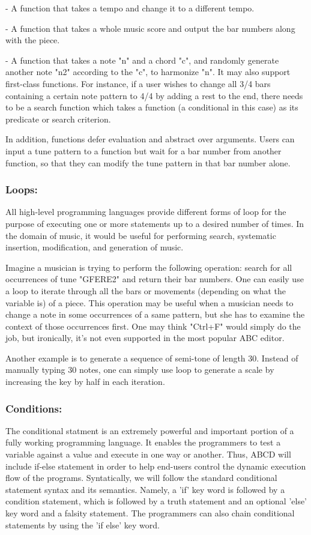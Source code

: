     - A function that takes a tempo and change it to a different tempo.

    - A function that takes a whole music score and output the bar numbers along with the piece.
    
    - A function that takes a note "n" and a chord "c", and randomly generate another note "n2" according to the "c", to harmonize "n".
      It may also support first-class functions. For instance, if a user wishes to change all 3/4 bars containing a certain note pattern to 4/4 by adding a rest to the end, there needs to be a search function which takes a function (a conditional in this case) as its predicate or search criterion. 

     In addition, functions defer evaluation and abstract over arguments. Users can input a tune pattern to a function but wait for a bar number from another function, so that they can modify the tune pattern in that bar number alone.  

    \subsubsection{Loops:}
    All high-level programming languages provide different forms of loop for the purpose of executing one or more statements up to a desired number of times. In the domain of music, it would be useful for performing search, systematic insertion, modification, and generation of music. 

    Imagine a musician is trying to perform the following operation: search for all occurrences of tune "GFERE2" and return their bar numbers. One can easily use a loop to iterate through all the bars or movements (depending on what the variable is) of a piece. This operation may be useful when a musician needs to change a note in some occurrences of a same pattern, but she has to examine the context of those occurrences first. One may think "Ctrl+F" would simply do the job, but ironically, it's not even supported in the most popular ABC editor\cite{SlashdotMedia17}.  

    Another example is to generate a sequence of semi-tone of length 30. Instead of manually typing 30 notes, one can simply use loop to generate a scale by increasing the key by half in each iteration.

    \subsubsection{Conditions:}
        The conditional statment is an extremely powerful and important portion of a fully working programming language. It enables the programmers to test a variable against a value and execute in one way or another. Thus, ABCD will include if-else statement in order to help end-users control the dynamic execution flow of the programs. Syntatically, we will follow the standard conditional statement syntax and its semantics. Namely, a 'if' key word is followed by a condition statement, which is followed by a truth statement and an optional 'else' key word and a falsity statement. The programmers can also chain conditional statements by using the 'if else' key word.

